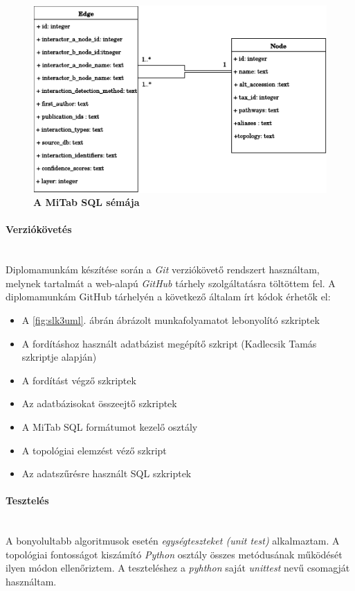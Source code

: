 \documentclass[a4paper,12pt]{article}
\begin{document}
				\begin{figure}[H]
					 \includegraphics[scale=0.7]{img/Mitab-SQL.pdf}
			 		 \centering
			 		 \caption{ \textbf{A MiTab SQL sémája} }
			 		 \label{fig:mitab_scheme}			 		 
				\end{figure}
				
			\paragraph{Verziókövetés} \mbox{}\\
			Diplomamunkám készítése során a \textit{Git} verziókövető rendszert használtam, melynek tartalmát a web-alapú \textit{GitHub} tárhely szolgáltatásra töltöttem fel. A diplomamunkám GitHub tárhelyén \cite{github} a következő általam írt kódok érhetők el: 
				\begin{itemize}
						\item A \ref{fig:slk3uml}. ábrán ábrázolt munkafolyamatot lebonyolító szkriptek
						\item A fordításhoz használt adatbázist megépítő szkript (Kadlecsik Tamás szkriptje alapján)
						\item A fordítást végző szkriptek
						\item Az adatbázisokat összeejtő szkriptek
						\item A MiTab SQL formátumot kezelő osztály
						\item A topológiai elemzést véző szkript
						\item Az adatszűrésre használt SQL szkriptek
				\end{itemize}
				
			\paragraph{Tesztelés} \mbox{}\\
			A bonyolultabb algoritmusok esetén \textit{egységteszteket (unit test)} alkalmaztam. A topológiai fontosságot kiszámító \textit{Python} osztály összes metódusának működését ilyen módon ellenőriztem. A teszteléshez a \textit{pyhthon} saját \textit{unittest} nevű csomagját használtam.
				
\end{document}
